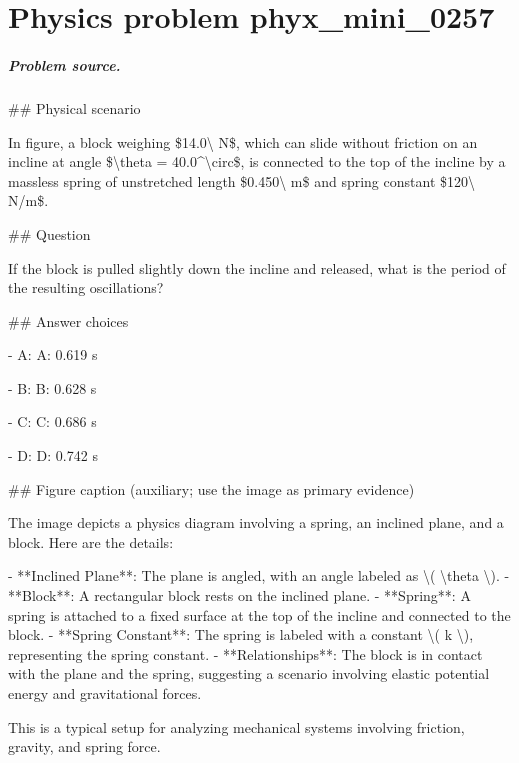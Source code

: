 
\chapter{Physics problem phyx\_mini\_0257}
\label{ch:PhyXMiniProblems_problem_phyx_mini_0257}

\paragraph{Problem source.}
\#\# Physical scenario

In figure, a block weighing \$14.0\textbackslash{} N\$, which can slide without friction on an incline at angle \$\textbackslash{}theta = 40.0\textasciicircum{}\textbackslash{}circ\$, is connected to the top of the incline by a massless spring of unstretched length \$0.450\textbackslash{} m\$ and spring constant \$120\textbackslash{} N/m\$.

\#\# Question

If the block is pulled slightly down the incline and released, what is the period of the resulting oscillations?

\#\# Answer choices

- A: A: 0.619 s

- B: B: 0.628 s

- C: C: 0.686 s

- D: D: 0.742 s

\#\# Figure caption (auxiliary; use the image as primary evidence)

The image depicts a physics diagram involving a spring, an inclined plane, and a block. Here are the details:

- **Inclined Plane**: The plane is angled, with an angle labeled as \textbackslash{}( \textbackslash{}theta \textbackslash{}).
- **Block**: A rectangular block rests on the inclined plane.
- **Spring**: A spring is attached to a fixed surface at the top of the incline and connected to the block.
- **Spring Constant**: The spring is labeled with a constant \textbackslash{}( k \textbackslash{}), representing the spring constant.
- **Relationships**: The block is in contact with the plane and the spring, suggesting a scenario involving elastic potential energy and gravitational forces.

This is a typical setup for analyzing mechanical systems involving friction, gravity, and spring force.

